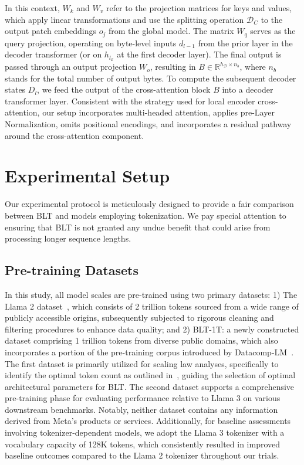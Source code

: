 In this context, $W_k$ and $W_v$ refer to the projection matrices for keys and values, which apply linear transformations and use the splitting operation $\mathcal{D}_C$ to the output patch embeddings $o_j$ from the global model. The matrix $W_q$ serves as the query projection, operating on byte-level inputs $d_{l-1}$ from the prior layer in the decoder transformer (or on $h_{l_{\mathcal{E}}}$ at the first decoder layer). The final output is passed through an output projection $W_o$, resulting in $B \in \mathbb{R}^{h_{\mathcal{D}} \times n_b}$, where $n_b$ stands for the total number of output bytes. To compute the subsequent decoder states $D_l$, we feed the output of the cross-attention block $B$ into a decoder transformer layer. Consistent with the strategy used for local encoder cross-attention, our setup incorporates multi-headed attention, applies pre-Layer Normalization, omits positional encodings, and incorporates a residual pathway around the cross-attention component.

\section{Experimental Setup}
\label{section:experiments}
Our experimental protocol is meticulously designed to provide a fair comparison between {\textsc BLT} and models employing tokenization. We pay special attention to ensuring that {\textsc BLT} is not granted any undue benefit that could arise from processing longer sequence lengths.

\subsection{Pre-training Datasets} In this study, all model scales are pre-trained using two primary datasets: 1) The Llama 2 dataset~\citep{touvron2023llama}, which consists of 2 trillion tokens sourced from a wide range of publicly accessible origins, subsequently subjected to rigorous cleaning and filtering procedures to enhance data quality; and 2) {\textsc BLT}-1T: a newly constructed dataset comprising 1 trillion tokens from diverse public domains, which also incorporates a portion of the pre-training corpus introduced by Datacomp-LM~\citep{li2024datacomp}. The first dataset is primarily utilized for scaling law analyses, specifically to identify the optimal token count as outlined in~\cite{dubey2024llama}, guiding the selection of optimal architectural parameters for {\textsc BLT}. The second dataset supports a comprehensive pre-training phase for evaluating performance relative to Llama 3 on various downstream benchmarks. Notably, neither dataset contains any information derived from Meta's products or services. Additionally, for baseline assessments involving tokenizer-dependent models, we adopt the Llama 3 tokenizer with a vocabulary capacity of 128K tokens, which consistently resulted in improved baseline outcomes compared to the Llama 2 tokenizer throughout our trials.

